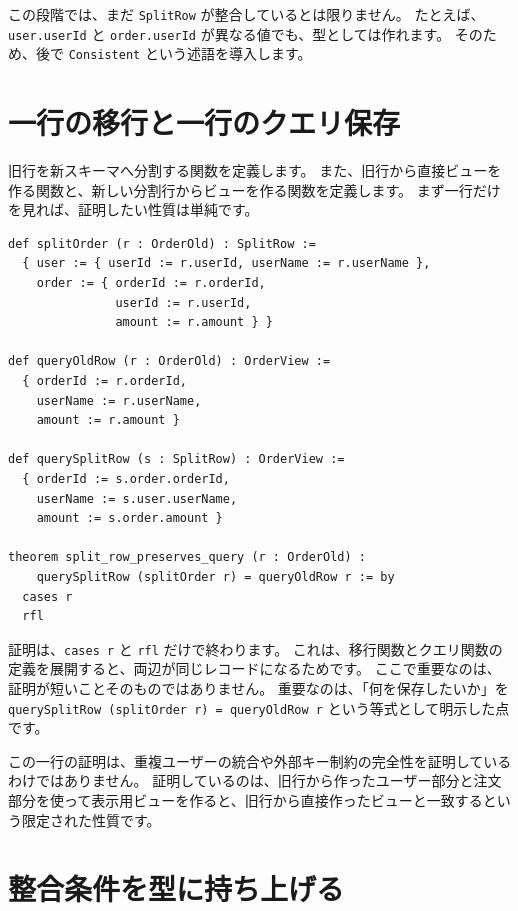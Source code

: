 この段階では、まだ \texttt{SplitRow} が整合しているとは限りません。
たとえば、\texttt{user.userId} と \texttt{order.userId} が異なる値でも、型としては作れます。
そのため、後で \texttt{Consistent} という述語を導入します。

\section{一行の移行と一行のクエリ保存}

旧行を新スキーマへ分割する関数を定義します。
また、旧行から直接ビューを作る関数と、新しい分割行からビューを作る関数を定義します。
まず一行だけを見れば、証明したい性質は単純です。

\begin{listing}[htbp]
\begin{verbatim}
def splitOrder (r : OrderOld) : SplitRow :=
  { user := { userId := r.userId, userName := r.userName },
    order := { orderId := r.orderId,
               userId := r.userId,
               amount := r.amount } }

def queryOldRow (r : OrderOld) : OrderView :=
  { orderId := r.orderId,
    userName := r.userName,
    amount := r.amount }

def querySplitRow (s : SplitRow) : OrderView :=
  { orderId := s.order.orderId,
    userName := s.user.userName,
    amount := s.order.amount }

theorem split_row_preserves_query (r : OrderOld) :
    querySplitRow (splitOrder r) = queryOldRow r := by
  cases r
  rfl
\end{verbatim}
\caption{\texttt{split\_row\_preserves\_query}}
\label{lst:ch32-row-preservation}
\end{listing}

証明は、\texttt{cases r} と \texttt{rfl} だけで終わります。
これは、移行関数とクエリ関数の定義を展開すると、両辺が同じレコードになるためです。
ここで重要なのは、証明が短いことそのものではありません。
重要なのは、「何を保存したいか」を \texttt{querySplitRow (splitOrder r) = queryOldRow r} という等式として明示した点です。

この一行の証明は、重複ユーザーの統合や外部キー制約の完全性を証明しているわけではありません。
証明しているのは、旧行から作ったユーザー部分と注文部分を使って表示用ビューを作ると、旧行から直接作ったビューと一致するという限定された性質です。

\section{整合条件を型に持ち上げる}


